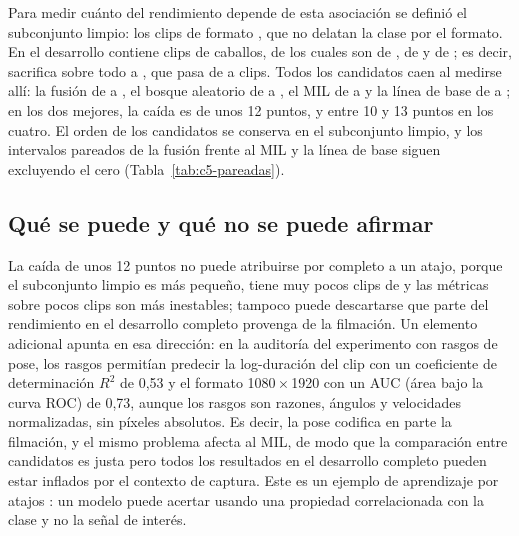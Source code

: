 Para medir cuánto del rendimiento depende de esta asociación se definió el subconjunto limpio: los clips de formato \CriterioLimpio{}, que no delatan la clase por el formato. En el desarrollo contiene \ClipsLimpioDesarrollo{} clips de \CaballosLimpioDesarrollo{} caballos, de los cuales \ClipsLimpioDisg{} son de , \ClipsLimpioInt{} de  y \ClipsLimpioSer{} de ; es decir, sacrifica sobre todo a , que pasa de \ClipsDevDisg{} a \ClipsLimpioDisg{} clips. Todos los candidatos caen al medirse allí: la fusión de \FusionDevF{} a \FusionLimpioF{}, el bosque aleatorio de \RFPoseDevF{} a \RFPoseLimpioF{}, el MIL de \MILDevF{} a \MILLimpioF{} y la línea de base de \BaseDevF{} a \BaseLimpioF{}; en los dos mejores, la caída es de unos 12 puntos, y entre 10 y 13 puntos en los cuatro. El orden de los candidatos se conserva en el subconjunto limpio, y los intervalos pareados de la fusión frente al MIL y la línea de base siguen excluyendo el cero (Tabla~\ref{tab:c5-pareadas}).

\subsection{Qué se puede y qué no se puede afirmar}
La caída de unos 12 puntos no puede atribuirse por completo a un atajo, porque el subconjunto limpio es más pequeño, tiene muy pocos clips de  y las métricas sobre pocos clips son más inestables; tampoco puede descartarse que parte del rendimiento en el desarrollo completo provenga de la filmación. Un elemento adicional apunta en esa dirección: en la auditoría del experimento con rasgos de pose, los \PoseRasgos{} rasgos permitían predecir la log-duración del clip con un coeficiente de determinación $R^2$ de 0,53 y el formato 1080\,$\times$\,1920 con un AUC (área bajo la curva ROC) de 0,73, aunque los rasgos son razones, ángulos y velocidades normalizadas, sin píxeles absolutos. Es decir, la pose codifica en parte la filmación, y el mismo problema afecta al MIL, de modo que la comparación entre candidatos es justa pero todos los resultados en el desarrollo completo pueden estar inflados por el contexto de captura. Este es un ejemplo de aprendizaje por atajos \parencite{geirhos2020}: un modelo puede acertar usando una propiedad correlacionada con la clase y no la señal de interés.

